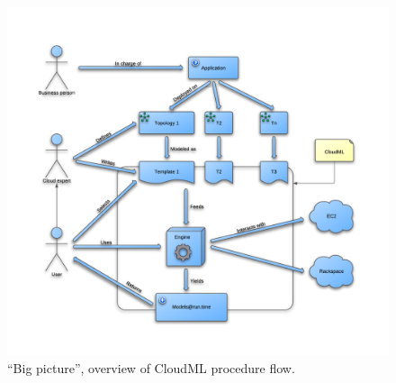 \begin{figure}
  \begin{center}
    \centerline{\includegraphics[width=1.5\linewidth]{img/big-picture.png}}
    \caption{``Big picture'', overview of CloudML procedure flow.}
    \label{fig:big-picture}
  \end{center}
\end{figure}
